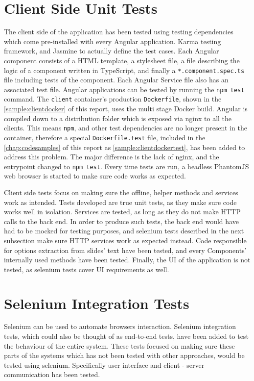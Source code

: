 \section{Client Side Unit Tests}
The client side of the application has been tested using testing dependencies which come
pre-installed with every Angular application. Karma\cite{63} testing framework, and
Jasmine\cite{64} to actually define the test cases. Each Angular component consists of a HTML
template, a stylesheet file, a file describing the logic of a component written in TypeScript,
and finally a \texttt{*.component.spec.ts} file including tests of the component. Each Angular
Service file also has an associated test file. Angular applications can be tested by running
the \texttt{npm test} command. The \texttt{client} container's production \texttt{Dockerfile}, shown
in the \autoref{sample:clientdocker} of this report, uses the multi stage Docker build. Angular is compiled down to
a distribution folder which is exposed via nginx to all the clients. This means \texttt{npm},
and other test dependencies are no longer present in the container, therefore a special \texttt{Dockerfile.test}
file, included in the \autoref{chap:codesamples} of this report as \autoref{sample:clientdockertest},
has been added to address this problem. The major difference is the lack of nginx, and the entrypoint
changed to \texttt{npm test}. Every time tests are run, a headless PhantomJS\cite{65} web browser
is started to make sure code works as expected.

Client side tests focus on making sure the offline, helper methods and services work as intended.
Tests developed are true unit tests, as they make sure code works well in isolation. Services
are tested, as long as they do not make HTTP calls to the back end. In order to produce such
tests, the back end would have had to be mocked for testing purposes, and selenium\cite{66} tests described
in the next subsection make sure HTTP services work as expected instead. Code responsible for
options extraction from slides' text have been tested, and every Components' internally
used methods have been tested. Finally, the UI of the application is not tested, as selenium
tests cover UI requirements as well.

\section{Selenium Integration Tests}
Selenium can be used to automate browsers interaction. Selenium integration tests,
which could also be thought of as end-to-end tests, have been added to test
the behaviour of the entire system. These tests focused on making sure these parts
of the systems which has not been tested with other approaches, would be tested
using selenium. Specifically user interface and client - server communication
has been tested.

